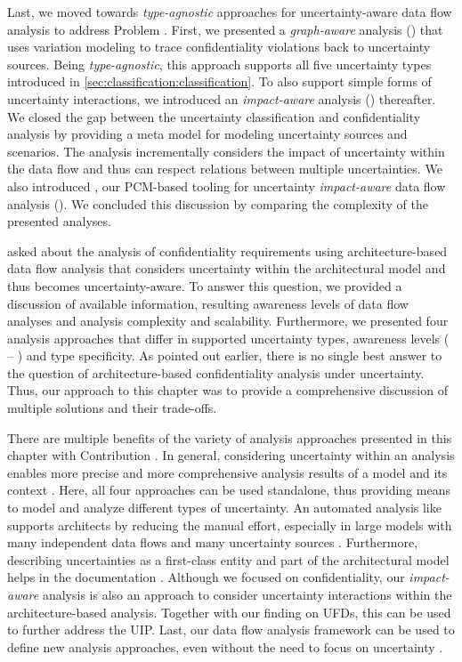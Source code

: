 Last, we moved towards \emph{type-agnostic} approaches for uncertainty-aware data flow analysis to address Problem .
First, we presented a \emph{graph-aware} analysis () that uses variation modeling \cite{mehl_palladio_2022,walter_architecture-based_2023} to trace confidentiality violations back to uncertainty sources.
Being \emph{type-agnostic}, this approach supports all five uncertainty types introduced in \autoref{sec:classification:classification}.
To also support simple forms of uncertainty interactions, we introduced an \emph{impact-aware} analysis () thereafter.
We closed the gap between the uncertainty classification and confidentiality analysis by providing a meta model for modeling uncertainty sources and scenarios.
The analysis incrementally considers the impact of uncertainty within the data flow and thus can respect relations between multiple uncertainties.
We also introduced \abunai, our \ac{PCM}-based tooling for uncertainty \emph{impact-aware} data flow analysis ().
We concluded this discussion by comparing the complexity of the presented analyses.

 asked about the analysis of confidentiality requirements using architecture-based data flow analysis that considers uncertainty within the architectural model and thus becomes uncertainty-aware.
To answer this question, we provided a discussion of available information, resulting awareness levels of data flow analyses and analysis complexity and scalability.
Furthermore, we presented four analysis approaches that differ in supported uncertainty types, awareness levels ( -- ) and type specificity.
As pointed out earlier, there is no single best answer to the question of architecture-based confidentiality analysis under uncertainty.
Thus, our approach to this chapter was to provide a comprehensive discussion of multiple solutions and their trade-offs.

There are multiple benefits of the variety of analysis approaches presented in this chapter with Contribution .
In general, considering uncertainty within an analysis enables more precise and more comprehensive analysis results of a model and its context \cite{weyns_towards_2023,weyns_introduction_2020,perez-palacin_dealing_2014}.
Here, all four approaches can be used standalone, thus providing means to model and analyze different types of uncertainty.
An automated analysis like \abunai supports architects by reducing the manual effort, especially in large models with many independent data flows and many uncertainty sources \cite{hahner_model-based_2023}.
Furthermore, describing uncertainties as a first-class entity and part of the architectural model helps in the documentation \cite{hahner_classification_2023}.
Although we focused on confidentiality, our \emph{impact-aware} analysis is also an approach to consider uncertainty interactions within the architecture-based analysis.
Together with our finding on \acp{UFD}, this can be used to further address the \ac{UIP}.
Last, our data flow analysis framework can be used to define new analysis approaches, even without the need to focus on uncertainty \cite{boltz_extensible_2024}.

